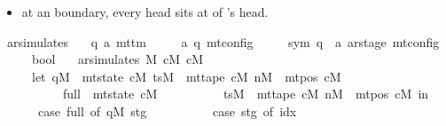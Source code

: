 \begin{isabellebody}
\begin{isamarkuptext}
\begin{itemize}
\item at an  boundary, every head sits at
 of 's head.%
\end{itemize}%
\end{isamarkuptext}\isamarkuptrue%
\isamarkupfalse%
\ ar{\isacharunderscore}{\kern0pt}simulates\ {\isacharcolon}{\kern0pt}{\isacharcolon}{\kern0pt}\isanewline
\ \ {\isachardoublequoteopen}{\isacharparenleft}{\kern0pt}{\isacharprime}{\kern0pt}q{\isacharcomma}{\kern0pt}\ {\isacharprime}{\kern0pt}a{\isacharparenright}{\kern0pt}\ mttm\isanewline
\ \ \ \ {\isasymRightarrow}\ {\isacharparenleft}{\kern0pt}{\isacharprime}{\kern0pt}a{\isacharcomma}{\kern0pt}\ {\isacharprime}{\kern0pt}q{\isacharparenright}{\kern0pt}\ mt{\isacharunderscore}{\kern0pt}config\isanewline
\ \ \ \ {\isasymRightarrow}\ {\isacharparenleft}{\kern0pt}sym{}{\isacharcomma}{\kern0pt}\ {\isacharprime}{\kern0pt}q\ {\isasymtimes}\ {\isacharprime}{\kern0pt}a\ ar{\isacharunderscore}{\kern0pt}stage{\isacharparenright}{\kern0pt}\ mt{\isacharunderscore}{\kern0pt}config\isanewline
\ \ \ \ {\isasymRightarrow}\ bool{\isachardoublequoteclose}\ \isanewline
\ \ {\isachardoublequoteopen}ar{\isacharunderscore}{\kern0pt}simulates\ M\ cM\ cM{\isacharprime}{\kern0pt}\ {\isasymlongleftrightarrow}\isanewline
\ \ \ \ \ {\isacharparenleft}{\kern0pt}let\ qM\ {\isacharequal}{\kern0pt}\ mt{\isacharunderscore}{\kern0pt}state\ cM{\isacharsemicolon}{\kern0pt}\ tsM\ {\isacharequal}{\kern0pt}\ mt{\isacharunderscore}{\kern0pt}tape\ cM{\isacharsemicolon}{\kern0pt}\ nM\ {\isacharequal}{\kern0pt}\ mt{\isacharunderscore}{\kern0pt}pos\ cM{\isacharsemicolon}{\kern0pt}\isanewline
\ \ \ \ \ \ \ \ \ \ full\ {\isacharequal}{\kern0pt}\ mt{\isacharunderscore}{\kern0pt}state\ cM{\isacharprime}{\kern0pt}{\isacharsemicolon}{\kern0pt}\isanewline
\ \ \ \ \ \ \ \ \ \ tsM{\isacharprime}{\kern0pt}\ {\isacharequal}{\kern0pt}\ mt{\isacharunderscore}{\kern0pt}tape\ cM{\isacharprime}{\kern0pt}{\isacharsemicolon}{\kern0pt}\ nM{\isacharprime}{\kern0pt}\ {\isacharequal}{\kern0pt}\ mt{\isacharunderscore}{\kern0pt}pos\ cM{\isacharprime}{\kern0pt}\ in\isanewline
\ \ \ \ \ \ {\isacharparenleft}{\kern0pt}case\ full\ of\ {\isacharparenleft}{\kern0pt}qM{\isacharprime}{\kern0pt}{\isacharcomma}{\kern0pt}\ stg{\isacharparenright}{\kern0pt}\ {\isasymRightarrow}\isanewline
\ \ \ \ \ \ \ \ \ {\isacharparenleft}{\kern0pt}case\ stg\ of\ {\isacharparenleft}{\kern0pt}idx{\isacharcomma}{\kern0pt}\ {\isacharunderscore}{\kern0pt}{\isacharcomma}{\kern0pt}\ {\isacharunderscore}{\kern0pt}{\isacharcomma}{\kern0pt}\ {\isacharunderscore}{\kern0pt}{\isacharcomma}{\kern0pt}\ {\isacharunderscore}{\kern0pt}{\isacharcomma}{\kern0pt}\ {\isacharunderscore}{\kern0pt}{\isacharparenright}{\kern0pt}\ {\isasymRightarrow}\isanewline

\end{isabellebody}
